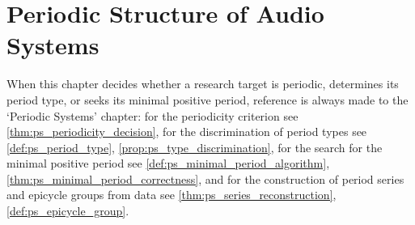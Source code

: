 \chapter{Periodic Structure of Audio Systems}

\begin{remark}\label{rem:audio_ps_hook}
When this chapter decides whether a research target is periodic, determines its period type, or seeks its minimal positive period, reference is always made to the `Periodic Systems' chapter:
for the periodicity criterion see \cref{thm:ps_periodicity_decision},
for the discrimination of period types see \cref{def:ps_period_type}, \cref{prop:ps_type_discrimination},
for the search for the minimal positive period see \cref{def:ps_minimal_period_algorithm}, \cref{thm:ps_minimal_period_correctness},
and for the construction of period series and epicycle groups from data see \cref{thm:ps_series_reconstruction}, \cref{def:ps_epicycle_group}.
\end{remark}

